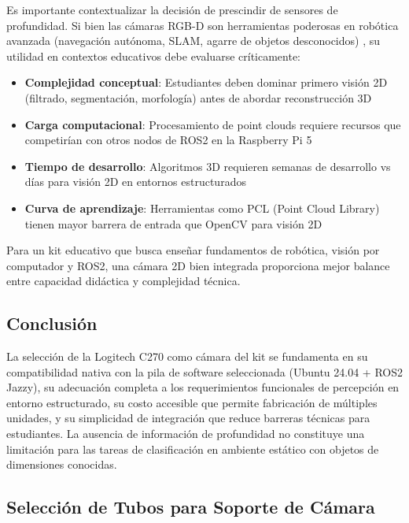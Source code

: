 Es importante contextualizar la decisión de prescindir de sensores de profundidad. Si bien las cámaras RGB-D son herramientas poderosas en robótica avanzada (navegación autónoma, SLAM, agarre de objetos desconocidos) \cite{Rosinol2020Kimera}, su utilidad en contextos educativos debe evaluarse críticamente:

\begin{itemize}
    \item \textbf{Complejidad conceptual}: Estudiantes deben dominar primero visión 2D (filtrado, segmentación, morfología) antes de abordar reconstrucción 3D
    
    \item \textbf{Carga computacional}: Procesamiento de point clouds requiere recursos que competirían con otros nodos de ROS2 en la Raspberry Pi 5
    
    \item \textbf{Tiempo de desarrollo}: Algoritmos 3D requieren semanas de desarrollo vs días para visión 2D en entornos estructurados
    
    \item \textbf{Curva de aprendizaje}: Herramientas como PCL (Point Cloud Library) tienen mayor barrera de entrada que OpenCV para visión 2D
\end{itemize}

Para un kit educativo que busca enseñar fundamentos de robótica, visión por computador y ROS2, una cámara 2D bien integrada proporciona mejor balance entre capacidad didáctica y complejidad técnica.

\subsection{Conclusión}

La selección de la Logitech C270 como cámara del kit se fundamenta en su compatibilidad nativa con la pila de software seleccionada (Ubuntu 24.04 + ROS2 Jazzy), su adecuación completa a los requerimientos funcionales de percepción en entorno estructurado, su costo accesible que permite fabricación de múltiples unidades, y su simplicidad de integración que reduce barreras técnicas para estudiantes. La ausencia de información de profundidad no constituye una limitación para las tareas de clasificación en ambiente estático con objetos de dimensiones conocidas.

\subsection{Selección de Tubos para Soporte de Cámara}

